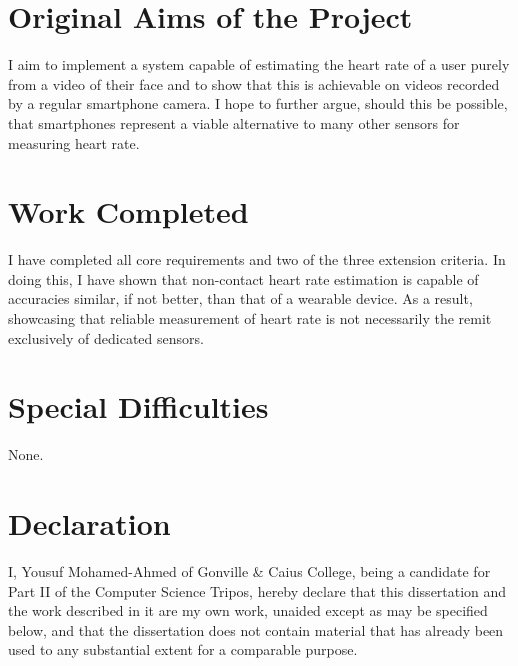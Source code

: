 \documentclass[12pt,twoside,notitlepage]{report}
\begin{document}
\section*{Original Aims of the Project}
 I aim to implement a system capable of estimating the heart rate of a user purely from a video of their face and to show that this is achievable
on videos recorded by a regular smartphone camera. I hope to further argue, should this be possible, that smartphones represent a viable 
alternative to many other sensors for measuring heart rate.


\section*{Work Completed}
I have completed all core requirements and two of the three extension criteria. In doing this, I have shown that 
non-contact heart rate estimation is capable of accuracies similar, if not better, than that of a wearable device. 
As a result, showcasing that reliable measurement of heart rate is not necessarily the remit exclusively of dedicated sensors.

\section*{Special Difficulties}
None.
 
\newpage
\section*{Declaration}

I, Yousuf Mohamed-Ahmed of Gonville \& Caius College, being a candidate for Part II of the Computer
Science Tripos, hereby declare
that this dissertation and the work described in it are my own work,
unaided except as may be specified below, and that the dissertation
does not contain material that has already been used to any substantial
extent for a comparable purpose.

\bigskip
{}

\medskip
{}

\cleardoublepage

\tableofcontents

\newpage


\cleardoublepage        %
\end{document}
